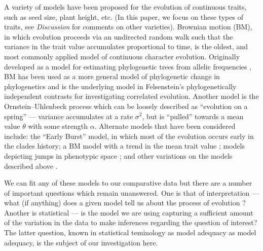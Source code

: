 \documentclass[12pt]{article}
\begin{document}
A variety of models have been proposed for the evolution of continuous traits, such as seed size, plant height, etc. (In this paper, we focus on these types of traits, see \textit{Discussion} for comments on other varieties). Brownian motion (BM), in which evolution proceeds via an undirected random walk such that the variance in the trait value accumulates proportional to time, is the oldest, and most commonly applied model of continuous character evolution. Originally developed as a model for estimating phylogenetic trees from allelic frequencies \citep{EC1964}, BM has been used as a more general model of phylogenetic change in phylogenetics \citep{Felsenstein1973, Thompson1975, Felsenstein1988} and is the underlying model in Felsenstein's phylogenetically independent contrasts \citep[PICs;][]{Felsenstein1985} for investigating correlated evolution. Another model is the Ornstein--Uhlenbeck process \citep[OU;][]{Hansen1997} which can be loosely described as ``evolution on a spring'' --- variance accumulates at a rate $\sigma^2$, but is ``pulled'' towards a mean value $\theta$ with some strength $\alpha$. Alternate models that have been considered include: the ``Early Burst'' \citep[EB;][]{Blomberg2003, Harmon2010, SlaterPennell} model, in which most of the evolution occurs early in the clades history; a BM model with a trend in the mean trait value \citep{Hunt2006}; models depicting jumps in phenotypic space \citep{Landis2012, Eastmanlevy}; and other variations on the models described above \citep[e.g.][]{Pagel1997, Pagel1999, ButlerKing2004, Omeara2006, Eastman2011, Beaulieu2012, SlaterMEE}.

We can fit any of these models to our comparative data but there are a number of important questions which remain unanswered. One is that of interpretation --- what (if anything) does a given model tell us about the process of evolution \citep{HansenMartins1996, Hansen2012, PennellHarmon}? Another is statistical --- is the model we are using capturing a sufficient amount of the variation in the data to make inferences regarding the question of interest? The latter question, known in statistical teminology as model adequacy as model adequacy, is the subject of our investigation here.
\end{document}
